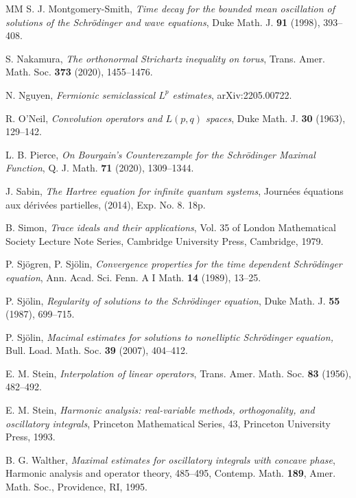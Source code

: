 \documentclass[a4paper]{amsart}
\numberwithin{equation}{section}%
\theoremstyle{plain}%
\theoremstyle{definition}
\theoremstyle{remark}%
\begin{document}
\begin{thebibliography}{MM}
 S. J. Montgomery-Smith, \textit{Time decay for the bounded mean oscillation of solutions of the Schr\"odinger and wave equations}, Duke Math. J. \textbf{91} (1998), 393--408.

 S. Nakamura, \textit{The orthonormal Strichartz inequality on torus}, Trans. Amer. Math. Soc. \textbf{373} (2020), 1455--1476.

 N. Nguyen, \textit{Fermionic semiclassical $L^p$ estimates}, arXiv:2205.00722.

 R. O'Neil, \textit{Convolution operators and $L(p, q)$ spaces}, Duke Math. J. \textbf{30} (1963), 129--142.

L. B. Pierce, 
\textit{On Bourgain’s Counterexample for the Schr\"{o}dinger Maximal Function}, 
Q. J. Math. \textbf{71} (2020), 1309--1344.

 J. Sabin, \textit{The Hartree equation for infinite quantum systems}, Journ\'{e}es \'{e}quations aux d\'{e}riv\'{e}es partielles, (2014), Exp. No. 8. 18p.

 B. Simon, \textit{Trace ideals and their applications}, Vol. 35 of London Mathematical Society Lecture Note Series, Cambridge University Press, Cambridge, 1979.


P. Sj\"ogren,
P. Sj\"olin,
\textit{Convergence properties for the time dependent Schr\"odinger equation},
Ann. Acad. Sci. Fenn. A I Math. \textbf{14} (1989), 13--25.

P. Sj\"olin,
\textit{Regularity of solutions to the Schr\"odinger equation},
Duke Math. J. \textbf{55} (1987), 699--715.

P. Sj\"olin, \textit{Macimal estimates for solutions to nonelliptic Schr\"odinger equation,} Bull. Load. Math. Soc. \textbf{39} (2007), 404--412.

 E. M. Stein, \textit{Interpolation of linear operators}, Trans. Amer. Math. Soc. \textbf{83} (1956), 482--492.

 E. M. Stein, \textit{Harmonic analysis: real-variable methods, orthogonality, and oscillatory integrals}, Princeton Mathematical Series, 43, Princeton University Press, 1993.

B. G. Walther, \textit{Maximal estimates for oscillatory integrals with concave phase}, Harmonic analysis and operator theory, 485--495, Contemp. Math. \textbf{189}, Amer. Math. Soc., Providence, RI, 1995. 

\end{thebibliography}
\end{document}
